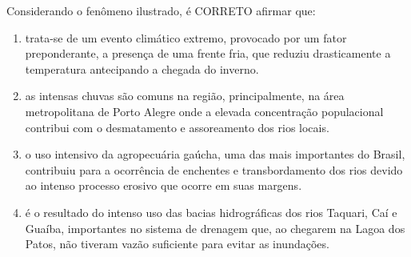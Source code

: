 Considerando o fenômeno ilustrado, é CORRETO afirmar que:
\begin{enumerate}
\item trata-se de um evento climático extremo, provocado por um fator preponderante, a presença de uma frente fria, que reduziu drasticamente a temperatura antecipando a chegada do inverno.
\item as intensas chuvas são comuns na região, principalmente, na área metropolitana de Porto Alegre onde a elevada concentração populacional contribui com o desmatamento e assoreamento dos rios locais.
\item o uso intensivo da agropecuária gaúcha, uma das mais importantes do Brasil, contribuiu para a ocorrência de enchentes e transbordamento dos rios devido ao intenso processo erosivo que ocorre em suas margens.
\item é o resultado do intenso uso das bacias hidrográficas dos rios Taquari, Caí e Guaíba, importantes no sistema de drenagem que, ao chegarem na Lagoa dos Patos, não tiveram vazão suficiente para evitar as inundações.
\end{enumerate}
